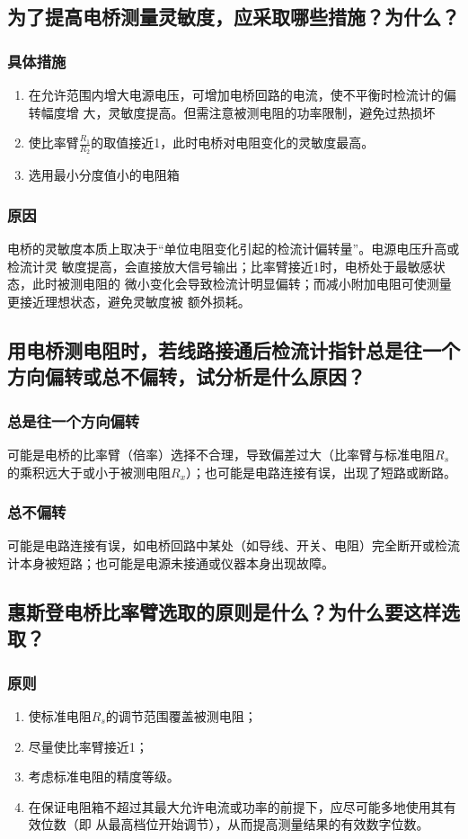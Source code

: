 \documentclass{../template/Report}%
\begin{document}
\begin{fullreportonly}
\subsection{为了提高电桥测量灵敏度，应采取哪些措施？为什么？}
\subsubsection{具体措施}
\begin{enumerate}
    \item 在允许范围内增大电源电压，可增加电桥回路的电流，使不平衡时检流计的偏转幅度增
    大，灵敏度提高。但需注意被测电阻的功率限制，避免过热损坏
    \item 使比率臂$\frac{R_1}{R_2}$的取值接近1，此时电桥对电阻变化的灵敏度最高。
    \item 选用最小分度值小的电阻箱
\end{enumerate}
\subsubsection{原因}
电桥的灵敏度本质上取决于“单位电阻变化引起的检流计偏转量”。电源电压升高或检流计灵
敏度提高，会直接放大信号输出；比率臂接近1时，电桥处于最敏感状态，此时被测电阻的
微小变化会导致检流计明显偏转；而减小附加电阻可使测量更接近理想状态，避免灵敏度被
额外损耗。
\subsection{用电桥测电阻时，若线路接通后检流计指针总是往一个方向偏转或总不偏转，试分析是什么原因？}
\subsubsection{总是往一个方向偏转}
可能是电桥的比率臂（倍率）选择不合理，导致偏差过大（比率臂与标准电阻$R_s$的乘积远大于或小于被测电阻$R_x$）；也可能是电路连接有误，出现了短路或断路。
\subsubsection{总不偏转}
可能是电路连接有误，如电桥回路中某处（如导线、开关、电阻）完全断开或检流计本身被短路；也可能是电源未接通或仪器本身出现故障。
\subsection{惠斯登电桥比率臂选取的原则是什么？为什么要这样选取？}
\subsubsection{原则}
\begin{enumerate}
    \item 使标准电阻$R_s$的调节范围覆盖被测电阻；
    \item 尽量使比率臂接近1；
    \item 考虑标准电阻的精度等级。
    \item 在保证电阻箱不超过其最大允许电流或功率的前提下，应尽可能多地使用其有效位数（即
        从最高档位开始调节），从而提高测量结果的有效数字位数。
\end{enumerate}

\end{fullreportonly}
\end{document}
